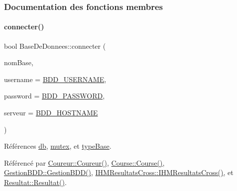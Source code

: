 \subsubsection{Documentation des fonctions membres}
\mbox{\label{class_base_de_donnees_ab2e092285ccc0ee1cce61a1774218561}} 
\paragraph{\texorpdfstring{connecter()}{connecter()}}
{\footnotesize\ttfamily bool Base\+De\+Donnees\+::connecter (\begin{DoxyParamCaption}\item[{Q\+String}]{nom\+Base,  }\item[{Q\+String}]{username = {\ttfamily \hyperlink{basededonnees_8h_a88b5f5b81fa534553c68802384beff2c}{B\+D\+D\+\_\+\+U\+S\+E\+R\+N\+A\+ME}},  }\item[{Q\+String}]{password = {\ttfamily \hyperlink{basededonnees_8h_ae2ded9166ed2553182545e97514c04f7}{B\+D\+D\+\_\+\+P\+A\+S\+S\+W\+O\+RD}},  }\item[{Q\+String}]{serveur = {\ttfamily \hyperlink{basededonnees_8h_af06096ec4ec654090fa78ab359d4a0dd}{B\+D\+D\+\_\+\+H\+O\+S\+T\+N\+A\+ME}} }\end{DoxyParamCaption})}



Références \hyperlink{class_base_de_donnees_a3e738dcf443370c46a541677ab619f06}{db}, \hyperlink{class_base_de_donnees_aa1b4696fac87a740f914aa73739086f2}{mutex}, et \hyperlink{class_base_de_donnees_ab682b82167f494496a6531bfe522b42b}{type\+Base}.



Référencé par \hyperlink{class_coureur_af3a5607d96a0960b1666164f6a74d539}{Coureur\+::\+Coureur()}, \hyperlink{class_course_af6317ecab95f8a2eb205b4f91b530992}{Course\+::\+Course()}, \hyperlink{class_gestion_b_d_d_a406bdb9b1714b204fa6fab015baffc27}{Gestion\+B\+D\+D\+::\+Gestion\+B\+D\+D()}, \hyperlink{class_i_h_m_resultats_cross_a94afa0356ebc98e497dfecca3e1bb00b}{I\+H\+M\+Resultats\+Cross\+::\+I\+H\+M\+Resultats\+Cross()}, et \hyperlink{class_resultat_a57e458f7abfc7463786ae9212bf55cd5}{Resultat\+::\+Resultat()}.


